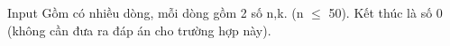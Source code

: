 Input
Gồm có nhiều dòng, mỗi dòng gồm 2 số n,k. (n $\le$ 50). Kết thúc là số 0 (không cần đưa ra đáp án cho trường hợp này).